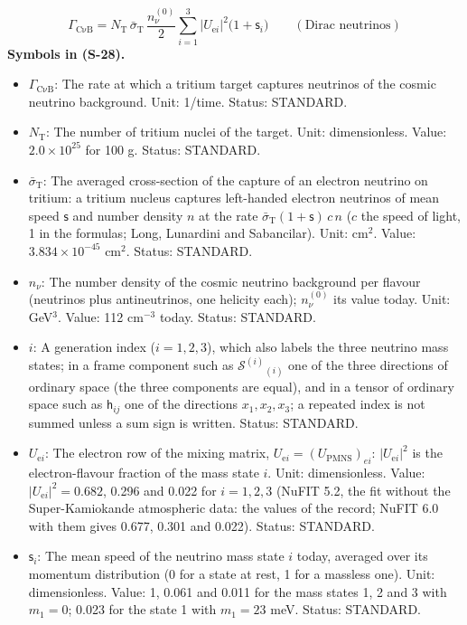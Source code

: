 \documentclass[
  10pt,
]{article}
\providecommand{\tightlist}{%
  \setlength{\itemsep}{0pt}\setlength{\parskip}{0pt}}
\begin{document}
\[
\Gamma_{\mathrm{C\nu B}} = N_{\mathrm{T}}\,\bar\sigma_{\mathrm{T}}\,\frac{n_\nu^{(0)}}{2}\sum_{i=1}^{3}\lvert U_{\mathrm{e}i}\rvert^2\big(1 + \mathsf{s}_i\big)\qquad(\text{Dirac neutrinos}) \tag{S-28}
\] \textbf{Symbols in (S-28).}

\begin{itemize}
\tightlist
\item
  \(\Gamma_{\mathrm{C\nu B}}\): The rate at which a tritium target
  captures neutrinos of the cosmic neutrino background. Unit: 1/time.
  Status: STANDARD.
\item
  \(N_{\mathrm{T}}\): The number of tritium nuclei of the target. Unit:
  dimensionless. Value: \(2.0\times10^{25}\) for 100 g. Status:
  STANDARD.
\item
  \(\bar\sigma_{\mathrm{T}}\): The averaged cross-section of the capture
  of an electron neutrino on tritium: a tritium nucleus captures
  left-handed electron neutrinos of mean speed \(\mathsf{s}\) and number
  density \(n\) at the rate
  \(\bar\sigma_{\mathrm{T}}(1 + \mathsf{s})\,c\,n\) (\(c\) the speed of
  light, 1 in the formulas; Long, Lunardini and Sabancilar). Unit:
  cm\(^2\). Value: \(3.834\times10^{-45}\) cm\(^2\). Status: STANDARD.
\item
  \(n_\nu\): The number density of the cosmic neutrino background per
  flavour (neutrinos plus antineutrinos, one helicity each);
  \(n_\nu^{(0)}\) its value today. Unit: GeV\(^3\). Value: 112
  cm\(^{-3}\) today. Status: STANDARD.
\item
  \(i\): A generation index (\(i = 1, 2, 3\)), which also labels the
  three neutrino mass states; in a frame component such as
  \(\mathcal{S}^{(i)}{}_{(i)}\) one of the three directions of ordinary
  space (the three components are equal), and in a tensor of ordinary
  space such as \(\mathsf{h}_{ij}\) one of the directions
  \(x_1, x_2, x_3\); a repeated index is not summed unless a sum sign is
  written. Status: STANDARD.
\item
  \(U_{\mathrm{e}i}\): The electron row of the mixing matrix,
  \(U_{\mathrm{e}i} = (U_{\mathrm{PMNS}})_{ei}\):
  \(\lvert U_{\mathrm{e}i}\rvert^2\) is the electron-flavour fraction of
  the mass state \(i\). Unit: dimensionless. Value:
  \(\lvert U_{\mathrm{e}i}\rvert^2 = 0.682\), 0.296 and 0.022 for
  \(i = 1, 2, 3\) (NuFIT 5.2, the fit without the Super-Kamiokande
  atmospheric data: the values of the record; NuFIT 6.0 with them gives
  0.677, 0.301 and 0.022). Status: STANDARD.
\item
  \(\mathsf{s}_i\): The mean speed of the neutrino mass state \(i\)
  today, averaged over its momentum distribution (0 for a state at rest,
  1 for a massless one). Unit: dimensionless. Value: 1, 0.061 and 0.011
  for the mass states 1, 2 and 3 with \(m_1 = 0\); 0.023 for the state 1
  with \(m_1 = 23\) meV. Status: STANDARD.
\end{itemize}
\end{document}
